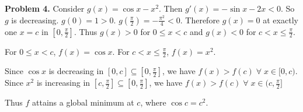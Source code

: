 \documentclass[12pt]{article}
\begin{document}
\textbf{Problem 4.}
Consider $g(x) = \cos x - x^{2}$. Then $g'(x) = - \sin x - 2x < 0$. So $g$ is decreasing. $g(0) = 1 > 0$. $g(\frac{\pi}{2}) = -\frac{\pi^{2}}{4} < 0$. Therefore $g(x) = 0$ at exactly one $x = c$ in $[0, \frac{\pi}{2}]$. Thus $g(x) > 0$ for $0 \leq x < c$ and $g(x) < 0$ for $c < x \leq \frac{\pi}{2}$.

For $0 \leq x < c$, $f(x) = \cos x$. For $c < x \leq \frac{\pi}{2}$, $f(x) = x^{2}$.

Since $\cos x$ is decreasing in $[0, c] \subseteq [0, \frac{\pi}{2}]$, we have $f(x) > f(c) \;\forall\; x \in [0, c)$. Since $x^{2}$ is increasing in $[c, \frac{\pi}{2}] \subseteq [0, \frac{\pi}{2}]$, we have $f(x) > f(c) \;\forall\; x \in (c, \frac{\pi}{2}]$

Thus $f$ attains a global minimum at $c$, where $\cos c = c^{2}$.
\end{document}
